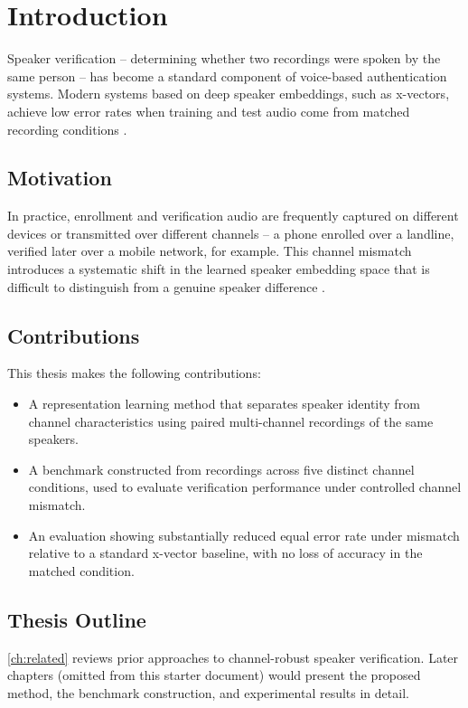 
\chapter{Introduction}
\label{ch:introduction}

Speaker verification -- determining whether two recordings were spoken by
the same person -- has become a standard component of voice-based
authentication systems. Modern systems based on deep speaker embeddings,
such as x-vectors, achieve low error rates when training and test audio
come from matched recording conditions \citep{snyder2018}.

\section{Motivation}
In practice, enrollment and verification audio are frequently captured on
different devices or transmitted over different channels -- a phone
enrolled over a landline, verified later over a mobile network, for
example. This channel mismatch introduces a systematic shift in the
learned speaker embedding space that is difficult to distinguish from a
genuine speaker difference \citep{kenny2010}.

\section{Contributions}
This thesis makes the following contributions:
\begin{itemize}
  \item A representation learning method that separates speaker identity
    from channel characteristics using paired multi-channel recordings of
    the same speakers.
  \item A benchmark constructed from recordings across five distinct
    channel conditions, used to evaluate verification performance under
    controlled channel mismatch.
  \item An evaluation showing substantially reduced equal error rate under
    mismatch relative to a standard x-vector baseline, with no loss of
    accuracy in the matched condition.
\end{itemize}

\section{Thesis Outline}
\ref{ch:related} reviews prior approaches to channel-robust speaker
verification. Later chapters (omitted from this starter document) would
present the proposed method, the benchmark construction, and experimental
results in detail.
